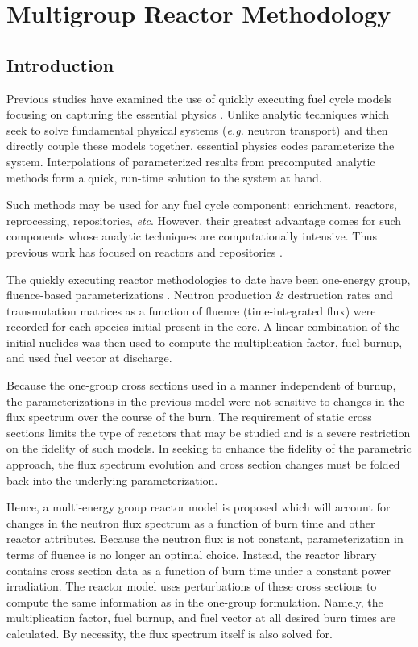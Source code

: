 \chapter{Multigroup Reactor Methodology}
\label{mg_paper}

\section{Introduction}
\label{mg_sec:intro}
Previous studies have examined the use of quickly executing fuel cycle models focusing on capturing 
the essential physics \cite{Li2009b}.  Unlike analytic techniques which seek to solve   
fundamental physical systems (\emph{e.g.} neutron transport) and then directly couple these models together, 
essential physics codes parameterize the system.   Interpolations
of parameterized results from precomputed analytic methods form a quick, run-time solution to the system at hand.

Such methods may be used for any fuel cycle component: enrichment, reactors, reprocessing, 
repositories, \emph{etc}.  However, their greatest advantage comes for such components whose analytic
techniques are computationally intensive.  Thus previous work has focused on reactors and repositories
\cite{Scopatz2009, Li2010a}.

The quickly executing reactor methodologies to date have been one-energy group, fluence-based 
parameterizations \cite{Schneider2005}.
Neutron production \& destruction rates and transmutation matrices as a function of fluence 
(time-integrated flux) were recorded for each species initial present in the core.  A linear combination of 
the initial nuclides was then used to compute the multiplication factor, fuel burnup, and used fuel 
vector at discharge.

Because the one-group cross sections used in a manner independent of burnup,
the parameterizations in the previous model were not sensitive to changes in the flux spectrum over the 
course of the burn.  The requirement of static cross sections limits the type of reactors that may be 
studied and is a severe restriction on the fidelity of such models.  In seeking to enhance
the fidelity of the parametric approach, the flux spectrum evolution and 
cross section changes must be folded back into the underlying parameterization.

Hence, a multi-energy group reactor model is proposed which will account for changes in the neutron
flux spectrum as a function of burn time and other reactor attributes.  Because the neutron flux is not constant, 
parameterization in terms of fluence is no longer an optimal choice.  Instead, the reactor library 
contains cross section data as a function of burn time under a constant power irradiation.  The reactor model 
uses perturbations of these cross sections to compute the same information as in the one-group 
formulation.  Namely, the multiplication factor, fuel burnup, and fuel vector at all desired burn times
are calculated.  By necessity, the flux spectrum itself is also solved for.  

